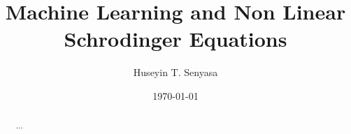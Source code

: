 \documentclass[%
 reprint,
 amsmath,amssymb,
 aps,
]{revtex4-1}
\begin{document}

\title{Machine Learning and Non Linear Schrodinger Equations}%

\author{Huseyin T. Senyasa}
%
%
%

\date{\today}%

\begin{abstract}
...
\end{abstract}

\maketitle
\end{document}
